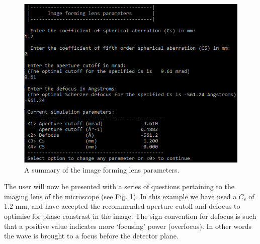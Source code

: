 \documentclass[12pt,a4paper]{article}
\begin{document}
%

\begin{figure}[!h]
\begin{center}
    \includegraphics[scale=0.75]{figures/pw_abs_lens.png}
\caption{A summary of the image forming lens parameters.}
\label{fig:pw_abs_lens}
\end{center}
\end{figure}

The user will now be presented with a series of questions pertaining to the imaging lens of the microscope (see Fig. \ref{fig:pw_abs_lens}). 
In this example we have used a $C_\text{s}$ of 1.2 mm, and have accepted the recommended aperture cutoff and defocus to optimise for phase constrast in the image.
The sign convention for defocus is such that a positive value indicates more `focusing' power (overfocus). 
In other words the wave is brought to a focus before the detector plane.  
\end{document}
